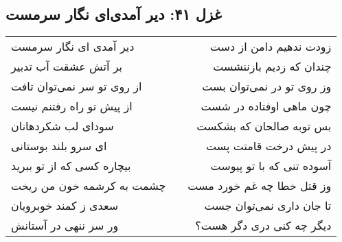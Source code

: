 \begin{center}
\section*{غزل ۴۱: دیر آمدی‌ای نگار سرمست}
\label{sec:041}
\begin{longtable}{l p{0.5cm} r}
دیر آمدی ای نگار سرمست
&&
زودت ندهیم دامن از دست
\\
بر آتش عشقت آب تدبیر
&&
چندان که زدیم بازننشست
\\
از روی تو سر نمی‌توان تافت
&&
وز روی تو در نمی‌توان بست
\\
از پیش تو راه رفتنم نیست
&&
چون ماهی اوفتاده در شست
\\
سودای لب شکردهانان
&&
بس توبه صالحان که بشکست
\\
ای سرو بلند بوستانی
&&
در پیش درخت قامتت پست
\\
بیچاره کسی که از تو ببرید
&&
آسوده تنی که با تو پیوست
\\
چشمت به کرشمه خون من ریخت
&&
وز قتل خطا چه غم خورد مست
\\
سعدی ز کمند خوبرویان
&&
تا جان داری نمی‌توان جست
\\
ور سر ننهی در آستانش
&&
دیگر چه کنی دری دگر هست؟
\\
\end{longtable}
\end{center}
